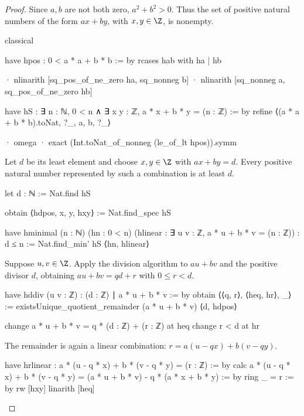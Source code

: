 \begin{proof}
  Since $a,b$ are not both zero, $a^{2}+b^{2}>0$. Thus the set of positive natural numbers of the form $ax+by$, with $x,y\in\Z$, is nonempty.

  \begin{lean}
    classical

    have hpos : 0 < a * a + b * b := by
      rcases hab with ha | hb

      · nlinarith [sq_pos_of_ne_zero ha, sq_nonneg b]
      · nlinarith [sq_nonneg a, sq_pos_of_ne_zero hb]

    have hS : ∃ n : ℕ, 0 < n ∧ ∃ x y : ℤ, a * x + b * y = (n : ℤ) := by
      refine ⟨(a * a + b * b).toNat, ?_, a, b, ?_⟩

      · omega
      · exact (Int.toNat_of_nonneg (le_of_lt hpos)).symm
  \end{lean}

  Let $d$ be its least element and choose $x,y\in\Z$ with $ax+by=d$. Every positive natural number represented by such a combination is at least $d$.

  \begin{lean}
    let d : ℕ := Nat.find hS

    obtain ⟨hdpos, x, y, hxy⟩ := Nat.find_spec hS

    have hminimal (n : ℕ) (hn : 0 < n)
        (hlinear : ∃ u v : ℤ, a * u + b * v = (n : ℤ)) : d ≤ n :=
      Nat.find_min' hS ⟨hn, hlinear⟩
  \end{lean}

  Suppose $u,v\in\Z$. Apply the division algorithm to $au+bv$ and the positive divisor $d$, obtaining $au+bv=qd+r$ with $0\le r<d$.

  \begin{lean}
    have hddiv (u v : ℤ) : (d : ℤ) ∣ a * u + b * v := by
      obtain ⟨⟨q, r⟩, ⟨heq, hr⟩, _⟩ :=
        existsUnique_quotient_remainder (a * u + b * v) ⟨d, hdpos⟩

      change a * u + b * v = q * (d : ℤ) + (r : ℤ) at heq
      change r < d at hr
  \end{lean}

  The remainder is again a linear combination: $r=a(u-qx)+b(v-qy)$.

  \begin{lean}
    have hrlinear : a * (u - q * x) + b * (v - q * y) = (r : ℤ) := by
      calc
        a * (u - q * x) + b * (v - q * y) =
            (a * u + b * v) - q * (a * x + b * y) := by
              ring
        _ = r := by
          rw [hxy]
          linarith [heq]
  \end{lean}


\end{proof}
